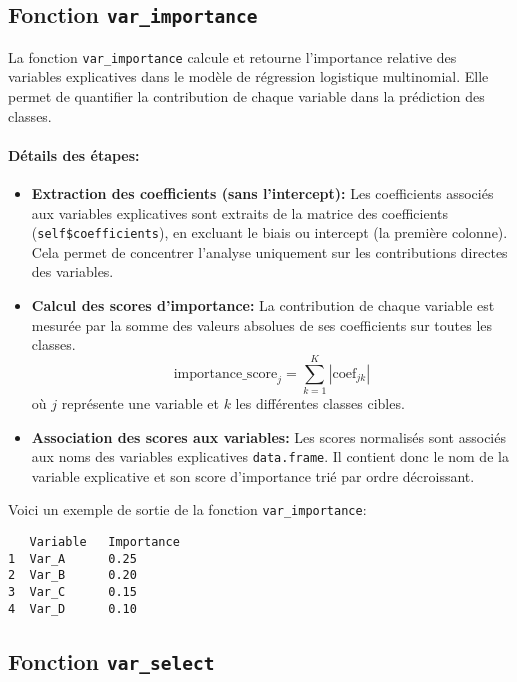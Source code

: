 \documentclass{rapport}
\begin{document}
\subsection{Fonction \texttt{var\_importance}}

La fonction \texttt{var\_importance} calcule et retourne l'importance relative des variables explicatives dans le modèle de régression logistique multinomial. Elle permet de quantifier la contribution de chaque variable dans la prédiction des classes.

\paragraph{Détails des étapes:}
\begin{itemize}
    \item \textbf{Extraction des coefficients (sans l'intercept):}
     Les coefficients associés aux variables explicatives sont extraits de la matrice des coefficients (\texttt{self\$coefficients}), en excluant le biais ou intercept (la première colonne). Cela permet de concentrer l'analyse uniquement sur les contributions directes des variables.
    

    \item \textbf{Calcul des scores d'importance:}
    La contribution de chaque variable est mesurée par la somme des valeurs absolues de ses coefficients sur toutes les classes.
        \[
        \text{importance\_score}_j = \sum_{k=1}^K |\text{coef}_{jk}|
        \]
        où \(j\) représente une variable et \(k\) les différentes classes cibles.

    \item \textbf{Association des scores aux variables:}
    Les scores normalisés sont associés aux noms des variables explicatives \texttt{data.frame}. Il contient donc le nom de la variable explicative et son score d'importance trié par ordre décroissant.
\end{itemize}

Voici un exemple de sortie de la fonction  \texttt{var\_importance}:
\begin{verbatim}
   Variable   Importance
1  Var_A      0.25
2  Var_B      0.20
3  Var_C      0.15
4  Var_D      0.10
\end{verbatim}


\subsection{Fonction \texttt{var\_select}}
\end{document}
